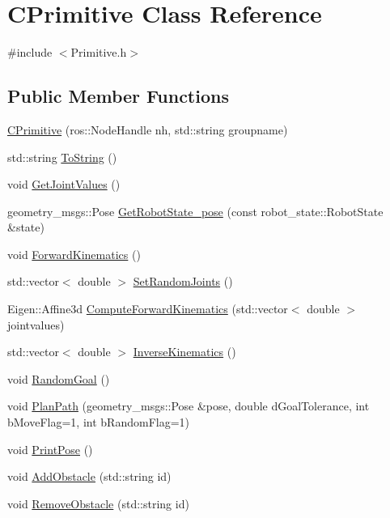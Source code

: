 \hypertarget{classCPrimitive}{\section{C\-Primitive Class Reference}
\label{classCPrimitive}
}


{\ttfamily \#include $<$Primitive.\-h$>$}

\subsection*{Public Member Functions}
\begin{DoxyCompactItemize}
\item 
\hyperlink{classCPrimitive_aab575a96a90e275bfa2c82800ef8c005}{C\-Primitive} (ros\-::\-Node\-Handle nh, std\-::string groupname)
\item 
std\-::string \hyperlink{classCPrimitive_a408ebf227dfb8e36bf9103f5feebcd61}{To\-String} ()
\item 
void \hyperlink{classCPrimitive_aef4bdc36e7575e6847e6eb3247b1cb9c}{Get\-Joint\-Values} ()
\item 
geometry\-\_\-msgs\-::\-Pose \hyperlink{classCPrimitive_ab99019451c0dec79bc79b18497ddd834}{Get\-Robot\-State\-\_\-pose} (const robot\-\_\-state\-::\-Robot\-State \&state)
\item 
void \hyperlink{classCPrimitive_ad3736f955467bd7a916a397543d9544c}{Forward\-Kinematics} ()
\item 
std\-::vector$<$ double $>$ \hyperlink{classCPrimitive_a7b3aae5fb6b2203add69561a9c7aa65f}{Set\-Random\-Joints} ()
\item 
Eigen\-::\-Affine3d \hyperlink{classCPrimitive_a334aa9f1b5f1946f485d54c62d47b020}{Compute\-Forward\-Kinematics} (std\-::vector$<$ double $>$ jointvalues)
\item 
std\-::vector$<$ double $>$ \hyperlink{classCPrimitive_a85b8173077e0b5094a6d8348e5700a77}{Inverse\-Kinematics} ()
\item 
void \hyperlink{classCPrimitive_a3d063adf3304dcf929fe24516e569d8d}{Random\-Goal} ()
\item 
void \hyperlink{classCPrimitive_aa248f6a5f8ecb5b9df1d9ffd24bc73bd}{Plan\-Path} (geometry\-\_\-msgs\-::\-Pose \&pose, double d\-Goal\-Tolerance, int b\-Move\-Flag=1, int b\-Random\-Flag=1)
\item 
void \hyperlink{classCPrimitive_ad2d40ebcacae01d171c240dd75df12d1}{Print\-Pose} ()
\item 
void \hyperlink{classCPrimitive_abf8f399e354026d1dfcb01db93327ba5}{Add\-Obstacle} (std\-::string id)
\item 
void \hyperlink{classCPrimitive_acb46ffef83e3bd53f31c6cd84d91fe1f}{Remove\-Obstacle} (std\-::string id)
\end{DoxyCompactItemize}
